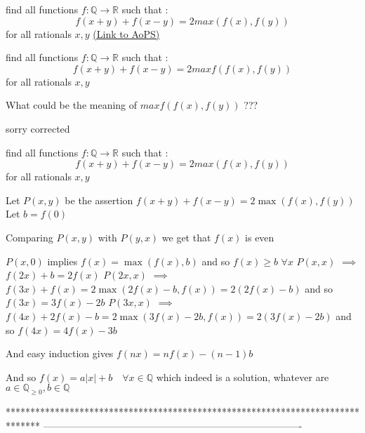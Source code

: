 \begin{problem}
	find all functions $f: \mathbb{Q} \rightarrow \mathbb{R}$ such that :
$$f(x+y)+f(x-y)=2max(f(x),f(y))$$ for all rationals $x,y$
	\flushright \href{https://artofproblemsolving.com/community/c6h1618764}{(Link to AoPS)}
\end{problem}



\begin{solution}
	\begin{tcolorbox}find all functions $f: \mathbb{Q} \rightarrow \mathbb{R}$ such that :
$$f(x+y)+f(x-y)=2maxf(f(x),f(y))$$ for all rationals $x,y$\end{tcolorbox}
What could be the meaning of $maxf(f(x),f(y))$ ??? 

\end{solution}



\begin{solution}
	sorry corrected
\end{solution}



\begin{solution}
	\begin{tcolorbox}find all functions $f: \mathbb{Q} \rightarrow \mathbb{R}$ such that :
$$f(x+y)+f(x-y)=2max(f(x),f(y))$$ for all rationals $x,y$\end{tcolorbox}
Let $P(x,y)$ be the assertion $f(x+y)+f(x-y)=2\max(f(x),f(y))$
Let $b=f(0)$

Comparing $P(x,y)$ with $P(y,x)$ we get that $f(x)$ is even

$P(x,0)$ implies $f(x)=\max(f(x),b)$ and so $f(x)\ge b$ $\forall x$
$P(x,x)$ $\implies$ $f(2x)+b=2f(x)$
$P(2x,x)$ $\implies$ $f(3x)+f(x)=2\max(2f(x)-b,f(x))=2(2f(x)-b)$ and so $f(3x)=3f(x)-2b$
$P(3x,x)$ $\implies$ $f(4x)+2f(x)-b=2\max(3f(x)-2b,f(x))=2(3f(x)-2b)$ and so $f(4x)=4f(x)-3b$

And easy induction gives $f(nx)=nf(x)-(n-1)b$

And so $\boxed{f(x)=a|x|+b\quad\forall x\in\mathbb Q}$ 
which indeed is a solution, whatever are $a\in\mathbb Q_{\ge 0},b\in\mathbb Q$


\end{solution}
*******************************************************************************
-------------------------------------------------------------------------------

